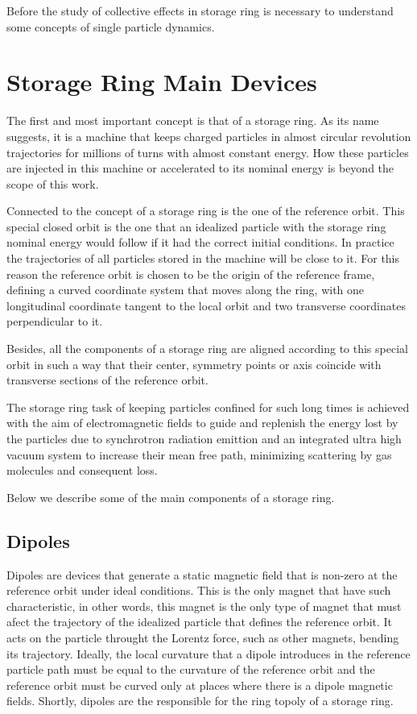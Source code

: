 \documentclass[
	12pt,				%
	openright,			%
	oneside,			%
	a4paper,		%
	chapter=TITLE,		%
	section=TITLE,		%
    brazil,				%
	english,			%
	sumario=tradicional,
	]{abntex2}
\begin{document}
Before the study of collective effects in storage ring is necessary to understand some concepts of single particle dynamics.

  \section{Storage Ring Main Devices}

  The first and most important concept is that of a storage ring. As its name suggests, it is a machine that keeps charged particles in almost circular revolution trajectories for millions of turns with almost constant energy. How these particles are injected in this machine or accelerated to its nominal energy is beyond the scope of this work.

  Connected to the concept of a storage ring is the one of the reference orbit. This special closed orbit is the one that an idealized particle with the storage ring nominal energy would follow if it had the correct initial conditions. In practice the trajectories of all particles stored in the machine will be close to it. For this reason the reference orbit is chosen to be the origin of the reference frame, defining a curved coordinate system that moves along the ring, with one longitudinal coordinate tangent to the local orbit and two transverse coordinates perpendicular to it.

  Besides, all the components of a storage ring are aligned according to this special orbit in such a way that their center, symmetry points or axis coincide with transverse sections of the reference orbit.

  The storage ring task of keeping particles confined for such long times is achieved with the aim of electromagnetic fields to guide and replenish the energy lost by the particles due to synchrotron radiation emittion and an integrated ultra high vacuum system to increase their mean free path, minimizing scattering by gas molecules and consequent loss.

  Below we describe some of the main components of a storage ring.

    \subsection{Dipoles}

    Dipoles are devices that generate a static magnetic field that is non-zero at the reference orbit under ideal conditions. This is the only magnet that have such characteristic, in other words, this magnet is the only type of magnet that must afect the trajectory of the idealized particle that defines the reference orbit. It acts on the particle throught the Lorentz force, such as other magnets, bending its trajectory. Ideally, the local curvature that a dipole introduces in the reference particle path must be equal to the curvature of the reference orbit and the reference orbit must be curved only at places where there is a dipole magnetic fields. Shortly, dipoles are the responsible for the ring topoly of a storage ring.
\end{document}
